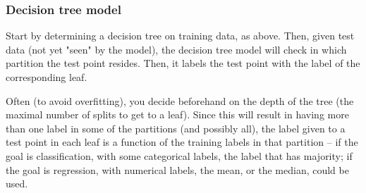 \documentclass[smaller]{beamer}
\theoremstyle{example}
\begin{document}




\begin{frame}
    \frametitle{Decision tree model}
    Start by determining a decision tree on training data, as above. Then, given test data (not yet "seen" by the model), the decision tree model will check in which partition the test point resides. Then, it labels the test point with the label of the corresponding leaf. 
    
    Often (to avoid overfitting), you decide beforehand on the depth of the tree (the maximal number of splits to get to a leaf). Since this will result in having more than one label in some of the partitions (and possibly all), the label given to a test point in each leaf is a function of the training labels in that partition {--} if the goal is classification, with some categorical labels, the label that has majority; if the goal is regression, with numerical labels, the mean, or the median, could be used.
\end{frame}


\end{document}
